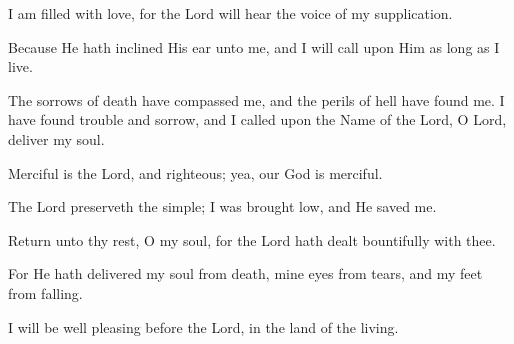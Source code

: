 I am filled with love, for the Lord will hear the voice of my supplication.

Because He hath inclined His ear unto me, and I will call upon Him as long as I live.

The sorrows of death have compassed me, and the perils of hell have found me. I have found trouble and sorrow, and I called upon the Name of the Lord, O Lord, deliver my soul.

Merciful is the Lord, and righteous; yea, our God is merciful.

The Lord preserveth the simple; I was brought low, and He saved me.

Return unto thy rest, O my soul, for the Lord hath dealt bountifully with thee.

For He hath delivered my soul from death, mine eyes from tears, and my feet from falling.

I will be well pleasing before the Lord, in the land of the living.

